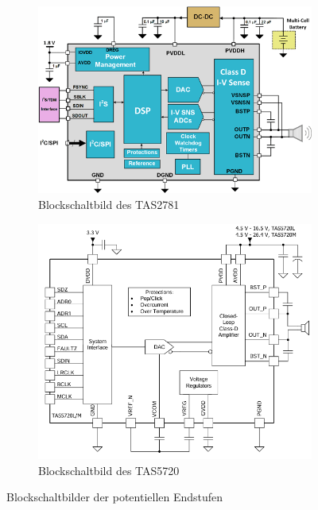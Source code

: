 \begin{figure}[H]
	\centering
	\begin{subfigure}{\textwidth}
		\centering
		\includegraphics[width=\textwidth*3/4]{pictures/Blockschaltbild_TAS2781.png}
		\vspace{2mm}
		\caption{Blockschaltbild des TAS2781}
		\label{pic:blockschaltbild_TAS2781}
		\vspace{8mm}
	\end{subfigure}
	\begin{subfigure}{\textwidth}
		\centering
		\includegraphics[width=\textwidth*3/4]{pictures/Blockschaltbild_TAS5720.png}
		\vspace{2mm}
		\caption{Blockschaltbild des TAS5720}
		\label{pic:blockschaltbild_TAS5720}
	\end{subfigure}
	\caption{Blockschaltbilder der potentiellen Endstufen}
\end{figure}
